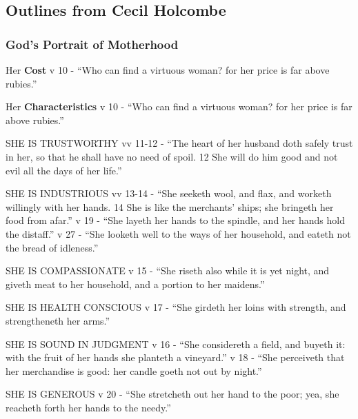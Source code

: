 \subsection{Outlines from Cecil Holcombe}

\subsubsection{God's Portrait of Motherhood}

\begin{compactenum}[I.]
    \item Her \textbf{Cost}  v 10 - “Who can find a virtuous woman? for her price is far above rubies.”
 	\item Her \textbf{Characteristics}  v 10 - “Who can find a virtuous woman? for her price is far above rubies.”
   \begin{compactenum}[A.]
    	\item SHE IS TRUSTWORTHY  vv 11-12  - “The heart of her husband doth safely trust in her, so that he shall have no need of spoil. {12} She will do him good and not evil all the days of her life.”
    	\item SHE IS INDUSTRIOUS  vv 13-14 - “She seeketh wool, and flax, and worketh willingly with her hands. {14} She is like the merchants' ships; she bringeth her food from afar.”   v 19 - “She layeth her hands to the spindle, and her hands hold the distaff.”  v 27 - “She looketh well to the ways of her household, and eateth not the bread of idleness.”
    	\item SHE IS COMPASSIONATE  v 15 - “She riseth also while it is yet night, and giveth meat to her household, and a portion to her maidens.”
    	\item SHE IS HEALTH CONSCIOUS  v 17 - “She girdeth her loins with strength, and strengtheneth her arms.”
    	\item SHE IS SOUND IN JUDGMENT  v 16 - “She considereth a field, and buyeth it: with the fruit of her hands she planteth a vineyard.”
 v 18 - “She perceiveth that her merchandise is good: her candle goeth not out by night.”
    	\item SHE IS GENEROUS  v 20 - “She stretcheth out her hand to the poor; yea, she reacheth forth her hands to the needy.”

\end{compactenum}
\end{compactenum}
